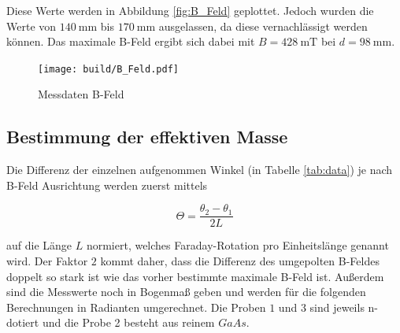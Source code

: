 Diese Werte werden in Abbildung \eqref{fig:B_Feld} geplottet. 
Jedoch wurden die Werte von $\qty{140}{\milli\meter}$ bis $\qty{170}{\milli\meter}$ ausgelassen, da diese vernachlässigt werden können. 
Das maximale B-Feld ergibt sich dabei mit $B=\qty{428}{\milli\tesla}$ bei $d=\qty{98}{\milli\meter}$. 

\begin{figure}[H]
	\centering
	\texttt{[image: build/B\_Feld.pdf]}
	\caption{Messdaten B-Feld}\label{fig:B_Feld}
\end{figure}

\subsection{Bestimmung der effektiven Masse}
Die Differenz der einzelnen aufgenommen Winkel (in Tabelle \eqref{tab:data}) je nach B-Feld Ausrichtung werden zuerst mittels 

\begin{equation}
    \Theta =\frac{\theta_2 - \theta_1}{2L} 
\end{equation}

auf die Länge $L$ normiert, welches Faraday-Rotation pro Einheitslänge genannt wird.  
Der Faktor $2$ kommt daher, dass die Differenz des umgepolten B-Feldes doppelt so stark ist wie das vorher bestimmte maximale B-Feld ist. 
Außerdem sind die Messwerte noch in Bogenmaß geben und werden für die folgenden Berechnungen in Radianten umgerechnet. 
Die Proben $1$ und $3$ sind jeweils n-dotiert und die Probe 2 besteht aus reinem $GaAs$. 

